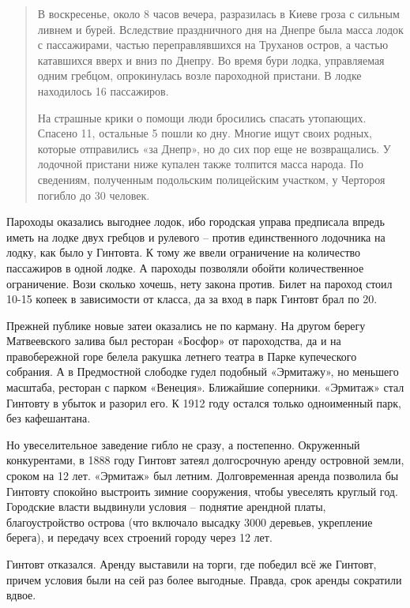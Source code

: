 \begin{quotation}
В воскресенье, около 8 часов вечера, разразилась в Киеве гроза с сильным ливнем и бурей. Вследствие праздничного дня на Днепре была масса лодок с пассажирами, частью переправлявшихся на Труханов остров, а частью катавшихся вверх и вниз по Днепру. Во время бури лодка, управляемая одним гребцом, опрокинулась возле пароходной пристани. В лодке находилось 16 пассажиров.

На страшные крики о помощи люди бросились спасать утопающих. Спасено 11, остальные 5 пошли ко дну. Многие ищут своих родных, которые отправились «за Днепр», но до сих пор еще не возвращались. У лодочной пристани ниже купален также толпится масса народа. По сведениям, полученным подольским полицейским участком, у Чертороя погибло до 30 человек.
\end{quotation}

Пароходы оказались выгоднее лодок, ибо городская управа предписала впредь иметь на лодке двух гребцов и рулевого – против единственного лодочника на лодку, как было у Гинтовта. К тому же ввели ограничение на количество пассажиров в одной лодке. А пароходы позволяли обойти количественное ограничение. Вози сколько хочешь, нету закона против. Билет на пароход стоил 10-15 копеек в зависимости от класса, да за вход в парк Гинтовт брал по 20.

Прежней публике новые затеи оказались не по карману. На другом берегу Матвеевского залива был ресторан «Босфор» от пароходства, да и на правобережной горе белела ракушка летнего театра в Парке купеческого собрания. А в Предмостной слободке гудел подобный «Эрмитажу», но меньшего масштаба, ресторан с парком «Венеция». Ближайшие соперники. «Эрмитаж» стал Гинтовту в убыток и разорил его. К 1912 году остался только одноименный парк, без кафешантана.

Но увеселительное заведение гибло не сразу, а постепенно. Окруженный конкурентами, в 1888 году Гинтовт затеял долгосрочную аренду островной земли, сроком на 12 лет. «Эрмитаж» был летним. Долговременная аренда позволила бы Гинтовту спокойно выстроить зимние сооружения, чтобы увеселять круглый год. Городские власти выдвинули условия – поднятие арендной платы, благоустройство острова (что включало высадку 3000 деревьев, укрепление берега), и передачу всех строений городу через 12 лет.

Гинтовт отказался. Аренду выставили на торги, где победил всё же Гинтовт, причем условия были на сей раз более выгодные. Правда, срок аренды сократили вдвое.

